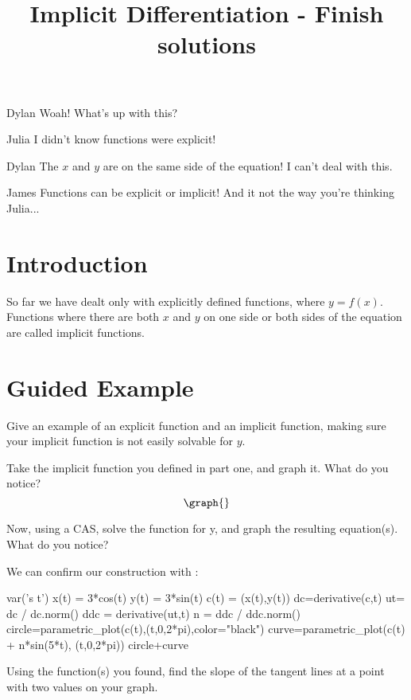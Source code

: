\documentclass{ximera}
\title{Implicit Differentiation - Finish solutions}
\begin{document}
\maketitle
\begin{dialogue}
\item[Dylan] Woah! What's up with this?
\item[Julia] I didn't know functions were explicit!
\item[Dylan] The $x$ and $y$ are on the same side of the equation! I can't deal with this.
\item[James] Functions can be explicit or implicit! And it not the way you're thinking Julia...
\end{dialogue}
\section{Introduction}
So far we have dealt only with explicitly defined functions, where $y=f(x)$.  Functions where there are both $x$ and $y$ on one side or both sides of the equation are called implicit functions.
\section{Guided Example}
\begin{question}
Give an example of an explicit function and an implicit function, making sure your implicit function is not easily solvable for $y$.
\begin{freeResponse}
\end{freeResponse}
\end{question}
\begin{question}
Take the implicit function you defined in part one, and graph it. What do you notice?
\[
\graph{}
\]
\begin{freeResponse}
\end{freeResponse}
\end{question}
\begin{question}
Now, using a CAS, solve the function for y, and graph the resulting equation(s). What do you notice?
\begin{onlineOnly}
We can confirm our construction with \sage:
\begin{sageCell}
var('s t')
x(t) = 3*cos(t)
y(t) = 3*sin(t)
c(t) = (x(t),y(t))
dc=derivative(c,t)
ut= dc / dc.norm()
ddc = derivative(ut,t)
n = ddc / ddc.norm()
circle=parametric_plot(c(t),(t,0,2*pi),color="black")
curve=parametric_plot(c(t) + n*sin(5*t), (t,0,2*pi))
circle+curve
\end{sageCell}
\end{onlineOnly}
\begin{freeResponse}
\end{freeResponse}
\end{question}
\begin{question}
Using the function(s) you found, find the slope of the tangent lines at a point with two values on your graph.
\begin{freeResponse}
\end{freeResponse}
\end{question}
\setcounter{problem}{0}
\end{document}
